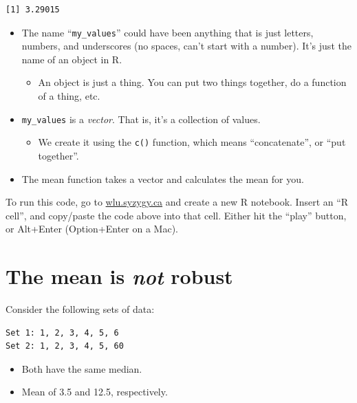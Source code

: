 \documentclass[
  letterpaper,
  DIV=11,
  numbers=noendperiod]{scrreprt}
\providecommand{\tightlist}{%
  \setlength{\itemsep}{0pt}\setlength{\parskip}{0pt}}\usepackage{longtable,booktabs,array}
\begin{document}
\begin{verbatim}
[1] 3.29015
\end{verbatim}

\begin{itemize}
\tightlist
\item
  The name ``\texttt{my\_values}'' could have been anything that is just
  letters, numbers, and underscores (no spaces, can't start with a
  number). It's just the name of an object in R.

  \begin{itemize}
  \tightlist
  \item
    An object is just a thing. You can put two things together, do a
    function of a thing, etc.
  \end{itemize}
\item
  \texttt{my\_values} is a \emph{vector}. That is, it's a collection of
  values.

  \begin{itemize}
  \tightlist
  \item
    We create it using the \texttt{c()} function, which means
    ``concatenate'', or ``put together''.
  \end{itemize}
\item
  The mean function takes a vector and calculates the mean for you.
\end{itemize}

To run this code, go to \url{wlu.syzygy.ca} and create a new R notebook.
Insert an ``R cell'', and copy/paste the code above into that cell.
Either hit the ``play'' button, or Alt+Enter (Option+Enter on a Mac).

\hypertarget{the-mean-is-not-robust}{%
\section{\texorpdfstring{The mean is \emph{not}
robust}{The mean is not robust}}\label{the-mean-is-not-robust}}

Consider the following sets of data:

\begin{verbatim}
Set 1: 1, 2, 3, 4, 5, 6
Set 2: 1, 2, 3, 4, 5, 60
\end{verbatim}

\pspace

\begin{itemize}
\tightlist
\item
  Both have the same median.\lspace
\item
  Mean of 3.5 and 12.5, respectively.
\end{itemize}
\end{document}
